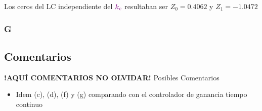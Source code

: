 Los ceros del LC independiente del \(\mathbin{\color{violet}k_c}\) resultaban ser $Z_{0} = 0.4062 $ y $Z_{1} = -1.0472$ 



\FloatBarrier
\subsubsection{G}%

\FloatBarrier
\subsection{Comentarios}


\textbf{!AQUÍ COMENTARIOS NO OLVIDAR!}
Posibles Comentarios
\begin{itemize}
    \item Idem (c), (d), (f) y (g) comparando con el controlador de ganancia tiempo continuo
\end{itemize}
